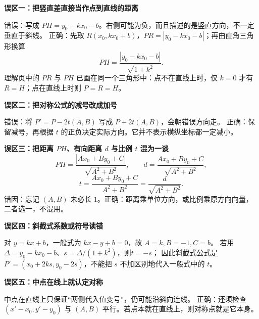 \begin{trapbox}
\textbf{\textcolor{CTrap}{误区一：把竖直差直接当作点到直线的距离}}

错误：写成 $PH=y_0-kx_0-b$。右侧可能为负，而且描述的是竖直方向，不一定垂直于斜线。
正确：先取 $R(x_0,kx_0+b)$，$PR=|y_0-kx_0-b|$；再由直角三角形换算
\[
 PH=\frac{|y_0-kx_0-b|}{\sqrt{1+k^2}}.
\]
理解页中的 $PR$ 与 $PH$ 已画在同一个三角形中：点不在直线上时，仅 $k=0$ 才有 $R=H$；点在直线上时则 $P=R=H$。

\medskip
\begin{minipage}{\linewidth}
\textbf{\textcolor{CTrap}{误区二：把对称公式的减号改成加号}}

\end{minipage}
错误：将 $P'=P-2t(A,B)$ 写成 $P+2t(A,B)$，会朝错误方向走。
正确：保留减号，再根据 $t$ 的正负决定实际方向。它并不表示横纵坐标都一定减小。

\medskip
\textbf{\textcolor{CTrap}{误区三：把距离 $PH$、有向距离 $d$ 与比例 $t$ 混为一谈}}
\[
 PH=\frac{|Ax_0+By_0+C|}{\sqrt{A^2+B^2}},\qquad
 d=\frac{Ax_0+By_0+C}{\sqrt{A^2+B^2}},
\]
\[
 t=\frac{Ax_0+By_0+C}{A^2+B^2}
   =\frac{d}{\sqrt{A^2+B^2}}.
\]
错因：忘记 $(A,B)$ 未必长 $1$。正确：距离乘单位方向，或比例乘原方向向量，二者选一，不混用。

\medskip
\textbf{\textcolor{CTrap}{误区四：斜截式系数或符号读错}}

对 $y=kx+b$，一般式为 $kx-y+b=0$，故 $A=k,B=-1,C=b$。
若用 $\Delta=y_0-kx_0-b$、$s=\Delta/(1+k^2)$，则\textbf{$t=-s$}；
因此斜截式公式是 $P'=(x_0+2ks,y_0-2s)$，不能把 $s$ 不加区别地代入一般式中的 $t$。

\medskip
\textbf{\textcolor{CTrap}{误区五：中点在线上就认定对称}}

中点在直线上只保证“两侧代入值变号”，仍可能沿斜向连线。
正确：还须检查 $(x'-x_0,y'-y_0)$ 与 $(A,B)$ 平行。若点本就在直线上，则对称点就是它本身。
\end{trapbox}

